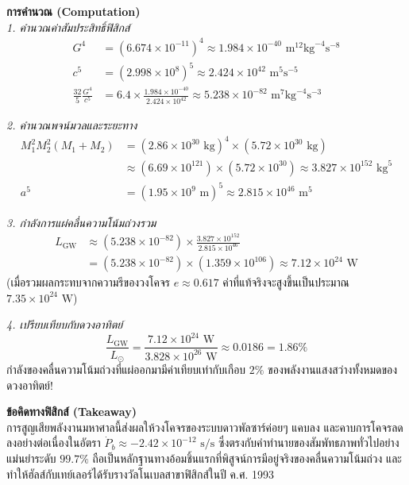 \begin{psctexample}
\textbf{การคำนวณ (Computation)} \\
\textit{1. คำนวณค่าสัมประสิทธิ์ฟิสิกส์}
\begin{align}
G^4 &= (6.674 \times 10^{-11})^4 \approx 1.984 \times 10^{-40}\text{ m}^{12}\text{kg}^{-4}\text{s}^{-8} \nonumber \\
c^5 &= (2.998 \times 10^8)^5 \approx 2.424 \times 10^{42}\text{ m}^5\text{s}^{-5} \nonumber \\
\frac{32}{5} \frac{G^4}{c^5} &= 6.4 \times \frac{1.984 \times 10^{-40}}{2.424 \times 10^{42}} \approx 5.238 \times 10^{-82}\text{ m}^7\text{kg}^{-4}\text{s}^{-3}
\end{align}

\textit{2. คำนวณพจน์มวลและระยะทาง}
\begin{align}
M_1^2 M_2^2 (M_1 + M_2) &= (2.86 \times 10^{30}\text{ kg})^4 \times (5.72 \times 10^{30}\text{ kg}) \nonumber \\
&\approx (6.69 \times 10^{121}) \times (5.72 \times 10^{30}) \approx 3.827 \times 10^{152}\text{ kg}^5 \nonumber \\
a^5 &= (1.95 \times 10^9\text{ m})^5 \approx 2.815 \times 10^{46}\text{ m}^5
\end{align}

\textit{3. กำลังการแผ่คลื่นความโน้มถ่วงรวม}
\begin{align}
L_{\text{GW}} &\approx (5.238 \times 10^{-82}) \times \frac{3.827 \times 10^{152}}{2.815 \times 10^{46}} \nonumber \\
&= (5.238 \times 10^{-82}) \times (1.359 \times 10^{106}) \approx 7.12 \times 10^{24}\text{ W}
\end{align}
(เมื่อรวมผลกระทบจากความรีของวงโคจร $e \approx 0.617$ ค่าที่แท้จริงจะสูงขึ้นเป็นประมาณ $7.35 \times 10^{24}\text{ W}$)

\textit{4. เปรียบเทียบกับดวงอาทิตย์}
\begin{equation}
\frac{L_{\text{GW}}}{L_\odot} = \frac{7.12 \times 10^{24}\text{ W}}{3.828 \times 10^{26}\text{ W}} \approx 0.0186 = 1.86\%
\end{equation}
กำลังของคลื่นความโน้มถ่วงที่แผ่ออกมามีค่าเทียบเท่ากับเกือบ $2\%$ ของพลังงานแสงสว่างทั้งหมดของดวงอาทิตย์!

\textbf{ข้อคิดทางฟิสิกส์ (Takeaway)} \\
การสูญเสียพลังงานมหาศาลนี้ส่งผลให้วงโคจรของระบบดาวพัลซาร์ค่อยๆ แคบลง และคาบการโคจรลดลงอย่างต่อเนื่องในอัตรา $\dot{P}_b \approx -2.42 \times 10^{-12}\text{ s/s}$ ซึ่งตรงกับคำทำนายของสัมพัทธภาพทั่วไปอย่างแม่นยำระดับ $99.7\%$ ถือเป็นหลักฐานทางอ้อมชิ้นแรกที่พิสูจน์การมีอยู่จริงของคลื่นความโน้มถ่วง และทำให้ฮัลส์กับเทย์เลอร์ได้รับรางวัลโนเบลสาขาฟิสิกส์ในปี ค.ศ. 1993
\qedexam
\end{psctexample}

